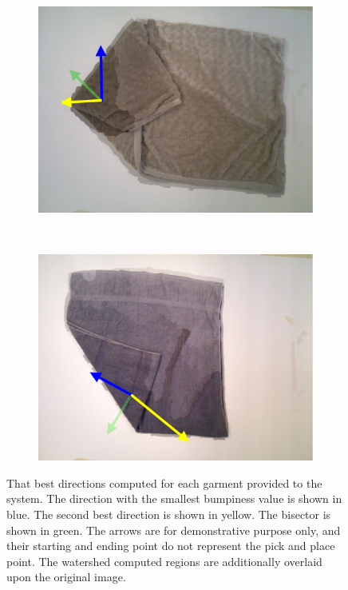 \begin{figure}[htbp]
\begin{subfigure}[l]{0.49\textwidth}
	    \centering
    	\includegraphics[width=\textwidth]
    	{figures/directions-05.pdf}
    	\vspace{-10px}
	\end{subfigure}
	~
    \begin{subfigure}[r]{0.49\textwidth}
	    \centering
    	\includegraphics[width=\textwidth]
    	{figures/directions-06.pdf}
    	\vspace{-10px}
	\end{subfigure} 
    \caption{That best directions computed for each garment provided to the system. The direction with the smallest bumpiness value is shown in blue. The second best direction is shown in yellow. The bisector is shown in green. The arrows are for demonstrative purpose only, and their starting and ending point do not represent the pick and place point. The watershed computed regions are additionally overlaid upon the original image. }
    \label{directions_several}
\end{figure}


